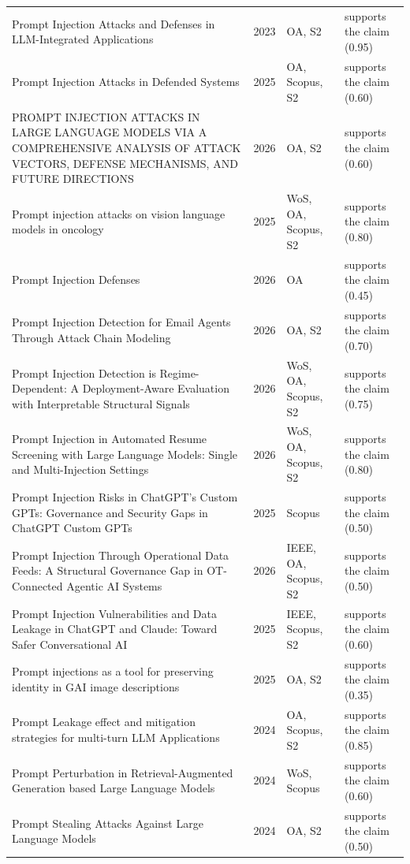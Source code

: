 \begin{longtable}{@{}%
  >{\raggedright\arraybackslash}p{}c%
  >{\raggedright\arraybackslash}p{}%
  >{\raggedright\arraybackslash}p{}@{}}
Prompt Injection Attacks and Defenses in LLM-Integrated Applications & 2023 & OA, S2 & supports the claim (0.95) \\
Prompt Injection Attacks in Defended Systems & 2025 & OA, Scopus, S2 & supports the claim (0.60) \\
PROMPT INJECTION ATTACKS IN LARGE LANGUAGE MODELS VIA A COMPREHENSIVE ANALYSIS OF ATTACK VECTORS, DEFENSE MECHANISMS, AND FUTURE DIRECTIONS & 2026 & OA, S2 & supports the claim (0.60) \\
Prompt injection attacks on vision language models in oncology & 2025 & WoS, OA, Scopus, S2 & supports the claim (0.80) \\
Prompt Injection Defenses & 2026 & OA & supports the claim (0.45) \\
Prompt Injection Detection for Email Agents Through Attack Chain Modeling & 2026 & OA, S2 & supports the claim (0.70) \\
Prompt Injection Detection is Regime-Dependent: A Deployment-Aware Evaluation with Interpretable Structural Signals & 2026 & WoS, OA, Scopus, S2 & supports the claim (0.75) \\
Prompt Injection in Automated Resume Screening with Large Language Models: Single and Multi-Injection Settings & 2026 & WoS, OA, Scopus, S2 & supports the claim (0.80) \\
Prompt Injection Risks in ChatGPT's Custom GPTs: Governance and Security Gaps in ChatGPT Custom GPTs & 2025 & Scopus & supports the claim (0.50) \\
Prompt Injection Through Operational Data Feeds: A Structural Governance Gap in OT-Connected Agentic AI Systems & 2026 & IEEE, OA, Scopus, S2 & supports the claim (0.50) \\
Prompt Injection Vulnerabilities and Data Leakage in ChatGPT and Claude: Toward Safer Conversational AI & 2025 & IEEE, Scopus, S2 & supports the claim (0.60) \\
Prompt injections as a tool for preserving identity in GAI image descriptions & 2025 & OA, S2 & supports the claim (0.35) \\
Prompt Leakage effect and mitigation strategies for multi-turn LLM Applications & 2024 & OA, Scopus, S2 & supports the claim (0.85) \\
Prompt Perturbation in Retrieval-Augmented Generation based Large Language Models & 2024 & WoS, Scopus & supports the claim (0.60) \\
Prompt Stealing Attacks Against Large Language Models & 2024 & OA, S2 & supports the claim (0.50) \\

\end{longtable}
